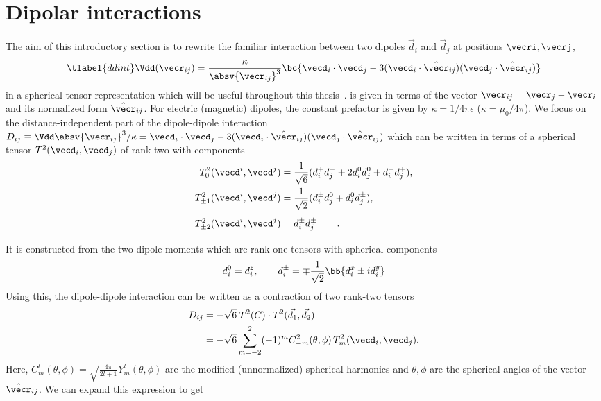 \section{Dipolar interactions}
The aim of this introductory section is to rewrite the familiar interaction between two dipoles $\vec{d}_i$ and $\vec{d}_j$ at positions $\vecri, \vecrj$,
\begin{align} \tlabel{ddint}
\Vdd(\vecr_{ij}) = \frac{\kappa}{\absv{\vecr_{ij}}^3} \bc{ \vecd_i \cdot \vecd_j -3 (\vecd_i \cdot \hat{\vecr}_{ij})(\vecd_j \cdot \hat{\vecr}_{ij}) }
\end{align}
in a spherical tensor representation which will be useful throughout this thesis~\cite{Micheli2007,Gorshkov2011c}.
 is given in terms of the vector $\vecr_{ij} = \vecr_j - \vecr_i$ and its normalized form $\hat{\vecr}_{ij}$.
For electric (magnetic) dipoles, the constant prefactor is given by $\kappa = 1/4\pi\epsilon$ ($\kappa=\mu_0/4\pi$).
We focus on the distance-independent part of the dipole-dipole interaction $D_{ij} \equiv \Vdd \absv{\vecr_{ij}}^3/\kappa=\vecd_i \cdot \vecd_j -3 (\vecd_i \cdot \hat{\vecr}_{ij})(\vecd_j \cdot \hat{\vecr}_{ij})$ which can be written in terms of a spherical tensor $T^2(\vecd_i, \vecd_j)$ of rank two with components
\begin{align}
T^2_0(\vecd^i, \vecd^j) &= \frac{1}{\sqrt{6}} (d_i^+ d_j^- + 2d_i^0 d_j^0 + d_i^{-} d_j^{+}), \\
T^2_{\pm 1}(\vecd^i, \vecd^j) &= \frac{1}{\sqrt{2}} (d_i^{\pm} d_j^0 + d_i^0 d_j^{\pm}), \\
T^2_{\pm 2}(\vecd^i, \vecd^j) &= d_i^{\pm} d_j^{\pm} \phantom{\frac{1}{\sqrt{42}}}.
\end{align}
It is constructed from the two dipole moments which are rank-one tensors with spherical components
\begin{align}\label{eq:dipsph}
d^0_i = d^z_i, \qquad d_i^\pm = \mp\frac{1}{\sqrt{2}}\bb{d_i^x\pm i d_i^y}
\end{align}
Using this, the dipole-dipole interaction can be written as a contraction of two rank-two tensors \cite{Brown2003}
\begin{align}
    D_{ij} &= -\sqrt{6} \: T^2(C)\cdot T^2(\vec{d_1},\vec{d_2})\\
           &= -\sqrt{6}  \sum_{m=-2}^{2} (-1)^m C^2_{-m}(\theta,\phi) \, T^2_m(\vecd_i,\vecd_j).
\end{align}
Here, $C^l_m(\theta,\phi)=\sqrt{\frac{4\pi}{2l+1}} Y^l_m(\theta,\phi)$ are the modified (unnormalized) spherical harmonics and $\theta, \phi$ are the spherical angles of the vector $\hat{\vecr}_{ij}$. We can expand this expression to get
